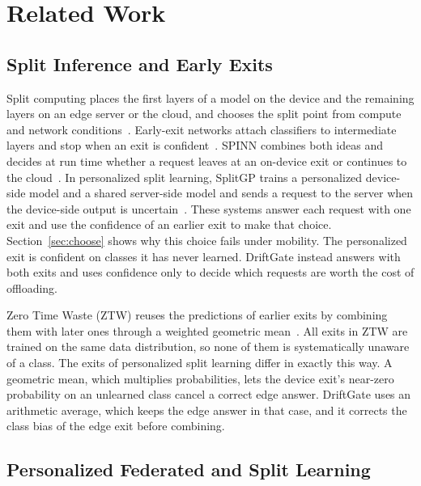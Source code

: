 \section{Related Work}
\label{sec:related}

\subsection{Split Inference and Early Exits}

Split computing places the first layers of a model on the device and the remaining layers on an edge server or the cloud, and chooses the split point from compute and network conditions~\cite{kang2017neurosurgeon,mao2017mecsurvey}. Early-exit networks attach classifiers to intermediate layers and stop when an exit is confident~\cite{teerapittayanon2016branchynet,kaya2019shallowdeep}. SPINN combines both ideas and decides at run time whether a request leaves at an on-device exit or continues to the cloud~\cite{laskaridis2020spinn}. In personalized split learning, SplitGP trains a personalized device-side model and a shared server-side model and sends a request to the server when the device-side output is uncertain~\cite{han2023splitgp}. These systems answer each request with one exit and use the confidence of an earlier exit to make that choice. Section~\ref{sec:choose} shows why this choice fails under mobility. The personalized exit is confident on classes it has never learned. DriftGate instead answers with both exits and uses confidence only to decide which requests are worth the cost of offloading.

Zero Time Waste (ZTW) reuses the predictions of earlier exits by combining them with later ones through a weighted geometric mean~\cite{wolczyk2021ztw}. All exits in ZTW are trained on the same data distribution, so none of them is systematically unaware of a class. The exits of personalized split learning differ in exactly this way. A geometric mean, which multiplies probabilities, lets the device exit's near-zero probability on an unlearned class cancel a correct edge answer. DriftGate uses an arithmetic average, which keeps the edge answer in that case, and it corrects the class bias of the edge exit before combining.

\subsection{Personalized Federated and Split Learning}

